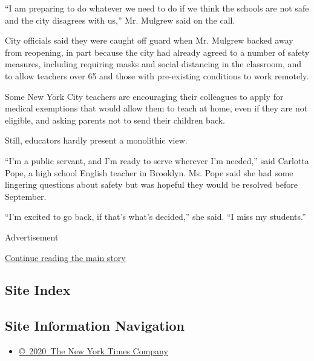 ``I am preparing to do whatever we need to do if we think the schools
are not safe and the city disagrees with us,'' Mr. Mulgrew said on the
call.

City officials said they were caught off guard when Mr. Mulgrew backed
away from reopening, in part because the city had already agreed to a
number of safety measures, including requiring masks and social
distancing in the classroom, and to allow teachers over 65 and those
with pre-existing conditions to work remotely.

Some New York City teachers are encouraging their colleagues to apply
for medical exemptions that would allow them to teach at home, even if
they are not eligible, and asking parents not to send their children
back.

Still, educators hardly present a monolithic view.

``I'm a public servant, and I'm ready to serve wherever I'm needed,''
said Carlotta Pope, a high school English teacher in Brooklyn. Ms. Pope
said she had some lingering questions about safety but was hopeful they
would be resolved before September.

``I'm excited to go back, if that's what's decided,'' she said. ``I miss
my students.''

Advertisement

\protect\hyperlink{after-bottom}{Continue reading the main story}

\hypertarget{site-index}{%
\subsection{Site Index}\label{site-index}}

\hypertarget{site-information-navigation}{%
\subsection{Site Information
Navigation}\label{site-information-navigation}}

\begin{itemize}
\tightlist
\item
  \href{https://help.nytimes.com/hc/en-us/articles/115014792127-Copyright-notice}{©~2020~The
  New York Times Company}
\end{itemize}

